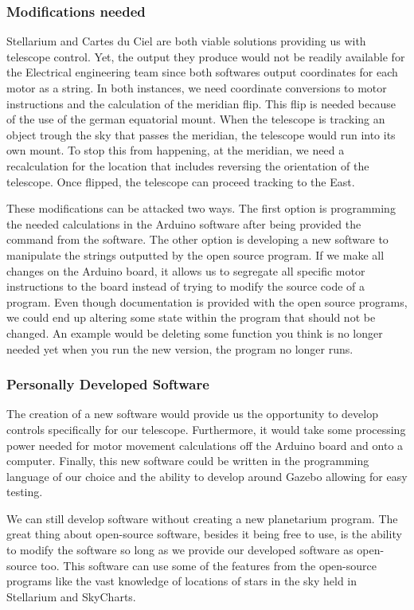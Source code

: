 \documentclass[12pt]{report}
\begin{document}
\subsubsection*{Modifications needed}

Stellarium and Cartes du Ciel are both viable solutions providing us with telescope control. Yet, the output they produce would not be readily available for the Electrical engineering team since both softwares output coordinates for each motor as a string. In both instances, we need coordinate conversions to motor instructions and the calculation of the meridian flip. This flip is needed because of the use of the german equatorial mount. When the telescope is tracking an object trough the sky that passes the meridian, the telescope would run into its own mount. To stop this from happening, at the meridian, we need a recalculation for the location that includes reversing the orientation of the telescope. Once flipped, the telescope can proceed tracking to the East.

These modifications can be attacked two ways. The first option is programming the needed calculations in the Arduino software after being provided the command from the software. The other option is developing a new software to manipulate the strings outputted by the open source program. If we make all changes on the Arduino board, it allows us to segregate all specific motor instructions to the board instead of trying to modify the source code of a program. Even though documentation is provided with the open source programs, we could end up altering some state within the program that should not be changed. An example would be deleting some function you think is no longer needed yet when you run the new version, the program no longer runs.

\subsubsection*{Personally Developed Software}

The creation of a new software would provide us the opportunity to develop controls specifically for our telescope. Furthermore, it would take some processing power needed for motor movement calculations off the Arduino board and onto a computer. Finally, this new software could be written in the programming language of our choice and the ability to develop around Gazebo allowing for easy testing.

We can still develop software without creating a new planetarium program. The great thing about open-source software, besides it being free to use, is the ability to modify the software so long as we provide our developed software as open-source too. This software can use some of the features from the open-source programs like the vast knowledge of locations of stars in the sky held in Stellarium and SkyCharts.
\end{document}
